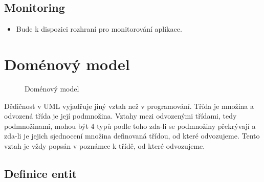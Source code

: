 \subsection{Monitoring}\label{subsec:monitoring}

\begin{itemize}
\item
  Bude k dispozici rozhraní pro monitorování aplikace.
\end{itemize}

\section{Doménový model}\label{sec:domenovy-model}

\begin{figure}[H]
    
    \caption{Doménový model}\label{fig:figure}
\end{figure}

\begin{tcolorbox}
Dědičnost v UML vyjadřuje jiný vztah než v programování.
Třída je množina a odvozená třída je její podmnožina.
Vztahy mezi odvozenými třídami, tedy podmnožinami, mohou být 4 typů podle toho zda-li se podmnožiny překrývají a zda-li je jejich sjednocení množina definovaná třídou, od které odvozujeme.
Tento vztah je vždy popsán v poznámce k třídě, od které odvozujeme.
\end{tcolorbox}

\subsection{Definice entit}\label{subsec:definiceentit}

